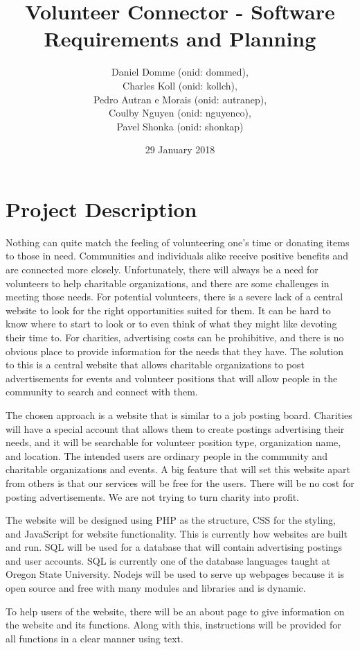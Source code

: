 \documentclass[12pt]{article}
\title{Volunteer Connector - Software Requirements and Planning}
\author{Daniel Domme (onid: dommed), \\
Charles Koll (onid: kollch), \\
Pedro Autran e Morais (onid: autranep), \\
Coulby Nguyen (onid: nguyenco), \\
Pavel Shonka (onid: shonkap)
}
\date{29 January 2018}
\begin{document}
\maketitle

\section{Project Description}
Nothing can quite match the feeling of volunteering one's time or donating items to those
in need. Communities and individuals alike receive positive benefits \cite{vol} and are
connected more closely. Unfortunately, there will always be a need for volunteers to help
charitable organizations, and there are some challenges in meeting those needs. For
potential volunteers, there is a severe lack of a central website to look for the right
opportunities suited for them. It can be hard to know where to start to look or to even
think of what they might like devoting their time to. For charities, advertising costs can
be prohibitive, and there is no obvious place to provide information for the needs that
they have. The solution to this is a central website that allows charitable organizations
to post advertisements for events and volunteer positions that will allow people in the
community to search and connect with them.

The chosen approach is a website that is similar to a job posting board. Charities will
have a special account that allows them to create postings advertising their needs, and it
will be searchable for volunteer position type, organization name, and location. The
intended users are ordinary people in the community and charitable organizations and
events. A big feature that will set this website apart from others is that our services
will be free for the users. There will be no cost for posting advertisements. We are not
trying to turn charity into profit.

The website will be designed using PHP as the structure, CSS for the styling, and
JavaScript for website functionality. This is currently how websites are built and run.
SQL will be used for a database that will contain advertising postings and user accounts.
SQL is currently one of the database languages taught at Oregon State University. Nodejs
will be used to serve up webpages because it is open source and free with many modules and
libraries and is dynamic. \cite{volwebsite}

To help users of the website, there will be an about page to give information on the
website and its functions. Along with this, instructions will be provided for all
functions in a clear manner using text.
\end{document}
